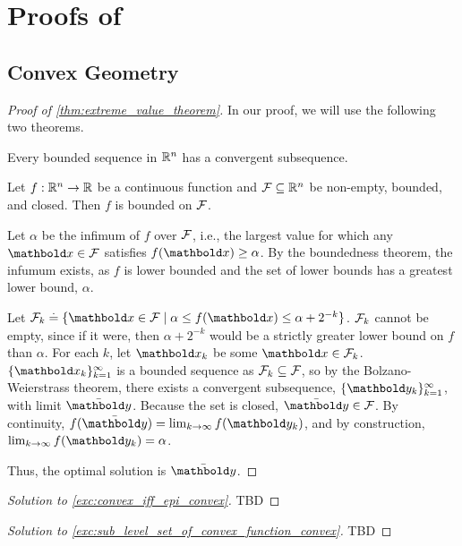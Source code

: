 
\chapter{Proofs of }

\section{Convex Geometry}

\begin{proof}[Proof of \cref{thm:extreme_value_theorem}] In our proof, we will use the following two theorems.
\begin{fct} Every bounded sequence in $\mathbb{R}^n$ has a convergent subsequence.
\end{fct}
\begin{fct}
Let $f : \mathbb{R}^n \to \mathbb{R}$ be a continuous function and $\mathcal{F} \subseteq \mathbb{R}^n$ be non-empty, bounded, and closed. Then $f$ is bounded on $\mathcal{F}$.
\end{fct}

Let $\alpha$ be the infimum of $f$ over $\mathcal{F}$, i.e., the largest value for which any $\vx \in \spa{F}$ satisfies $f(\vx) \geq \alpha$. By the boundedness theorem, the infumum exists, as $f$ is lower bounded and the set of lower bounds has a greatest lower bound, $\alpha$.

Let $\spa{F}_k \defeq \{\vx \in \spa{F} \mid \alpha \leq f(\vx) \leq \alpha + 2^{-k}\}$. $\mathcal{F}_k$ cannot be empty, since if it were, then $\alpha + 2^{-k}$ would be a strictly greater lower bound on $f$ than $\alpha$. For each $k$, let $\vx_k$ be some $\vx \in \spa{F}_k$. $\{\vx_k\}_{k=1}^\infty$ is a bounded sequence as $\mathcal{F}_k \subseteq \mathcal{F}$, so by the Bolzano-Weierstrass theorem, there exists a convergent subsequence, $\{\vy_k\}_{k=1}^\infty$, with limit $\Bar{\vy}$. Because the set is closed, $\Bar{\vy} \in \spa{F}$. By continuity, $f(\Bar{\vy}) = \lim_{k\to\infty} f(\vy_k)$, and by construction, $\lim_{k\to\infty} f(\vy_k) = \alpha$.

Thus, the optimal solution is $\Bar{\vy}$.
\end{proof}

\begin{proof}[Solution to \cref{exc:convex_iff_epi_convex}] TBD
\end{proof}

\begin{proof}[Solution to \cref{exc:sub_level_set_of_convex_function_convex}] TBD
\end{proof}
